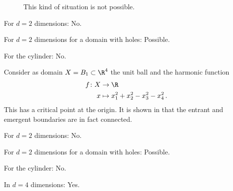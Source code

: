 \begin{frame}
  \begin{figure}
    \centering
    
    \caption{This kind of situation is not possible.}
    \label{fi:n3_cylinder}
  \end{figure}
\end{frame}

\begin{frame}

  {\questionFlowthrough
  \begin{answer}
    \begin{itemize}
      \item For $d=2$ dimensions: No.
      \item For $d=2$ dimensions for a domain with holes: Possible.
        {\item For the cylinder: No.}
    \end{itemize}
  \end{answer}}
\end{frame}

\begin{frame}
  \begin{example}[Connected entrant boundary in $d=4$ dimensions, {\cite[Ex.\ 4.7]{Koppenhoefer2024}}]\label{ex:n4}
    Consider as domain $X=B_1\subset\R^4$ the unit ball and
    the harmonic function 
    \begin{equation*}
      \begin{aligned}
      f\colon X&\to \R \\
      x &\mapsto x_1^2+x_2^2-x_3^2-x_4^2\,.
      \end{aligned}
      \label{eq:n4_deff}
    \end{equation*}
    This has a critical point at the origin.
    It is shown in \cite[Prop.\ 4.8]{Koppenhoefer2024} that the entrant and emergent boundaries are in fact connected.
  \end{example} 
\end{frame}

\begin{frame}

  {\questionFlowthrough
  \begin{answer}
    \begin{itemize}
      \item For $d=2$ dimensions: No.
      \item For $d=2$ dimensions for a domain with holes: Possible.
      \item For the cylinder: No.
        {\item In $d=4$ dimensions: Yes.}
    \end{itemize}
  \end{answer}}
\end{frame}


